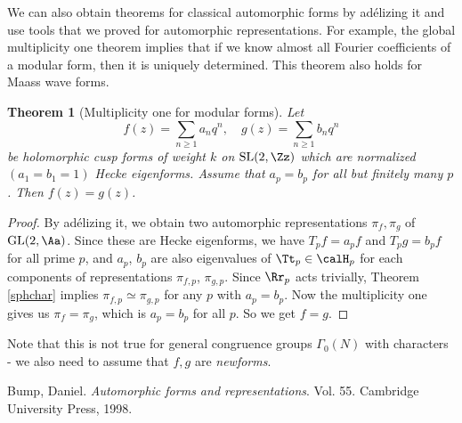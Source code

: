 \documentclass{article}
\newtheorem{theorem}{Theorem}[section]
\newcommand{\GL}{\mathrm{GL}}
\newcommand{\SL}{\mathrm{SL}}
\begin{document}
We can also obtain theorems for classical automorphic forms by ad\'elizing it and use tools that we proved for automorphic representations. 
For example, the global multiplicity one theorem implies that if we know almost all Fourier coefficients of a modular form, then it is uniquely determined. This theorem also holds for Maass wave forms. 
\begin{theorem}[Multiplicity one for modular forms]
Let $$f(z)= \sum_{n\geq 1} a_{n}q^{n}, \quad g(z) = \sum_{n\geq 1} b_{n}q^{n}$$ be holomorphic cusp forms of weight $k$ on $\SL(2, \Zz)$ which are normalized $(a_{1} = b_{1} = 1)$ Hecke eigenforms. 
Assume that $a_{p} = b_{p}$ for all but finitely many $p$. 
Then $f(z) = g(z)$. 
\end{theorem}
\begin{proof}
By ad\'elizing it, we obtain two automorphic representations $\pi_{f}, \pi_{g}$ of $\GL(2, \Aa)$. 
Since these are Hecke eigenforms, we have $T_{p}f = a_{p}f$ and $T_{p}g = b_{p}f$ for all prime $p$, and $a_{p}$, $b_{p}$ are also eigenvalues of $\Tt_{p} \in \calH_{p}$ for each components of representations $\pi_{f, p}$, $\pi_{g, p}$. Since $\Rr_{p}$ acts trivially, Theorem \ref{sphchar} implies $\pi_{f, p} \simeq \pi_{g, p}$ for any $p$ with $a_{p}= b_{p}$. Now the multiplicity one gives us $\pi_{f} = \pi_{g}$, which is $a_{p}= b_{p}$ for all $p$. So we get $f = g$. 
\end{proof}
Note that this is not true for general congruence groups $\Gamma_{0}(N)$ with characters - we also need to assume that $f, g$ are \emph{newforms}. 






\begin{thebibliography}{5}

 Bump, Daniel. \emph{Automorphic forms and representations}. Vol. 55. Cambridge University Press, 1998.


\end{thebibliography}
\end{document}
